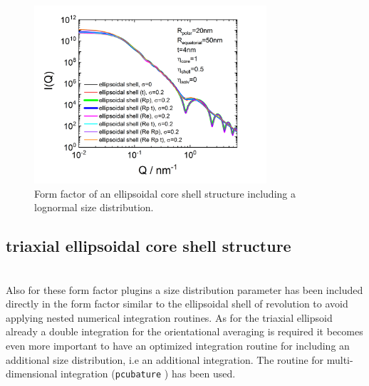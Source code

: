 \begin{figure}[htb]
\begin{center}
\includegraphics[width=0.768\textwidth]{../images/form_factor/Ellipsoid/spheroid_core_shell.png}
\end{center}
\caption{Form factor of an ellipsoidal core shell structure including a lognormal size distribution.} \label{fig:I_ellipsoidal_core_shell}
\end{figure}

\clearpage
\subsection{triaxial ellipsoidal core shell structure}
\label{sect:triaxEllShell1} ~\\
Also for these form factor plugins a size distribution parameter has been included directly in the form factor similar to the ellipsoidal shell of revolution to avoid applying nested numerical integration routines. As for the triaxial ellipsoid already a double integration for the orientational averaging is required it becomes even more important to have an optimized integration routine for including an additional size distribution, i.e an additional integration. The routine for multi-dimensional integration  (\texttt{pcubature} \cite{Johnson2017}) has been used.

